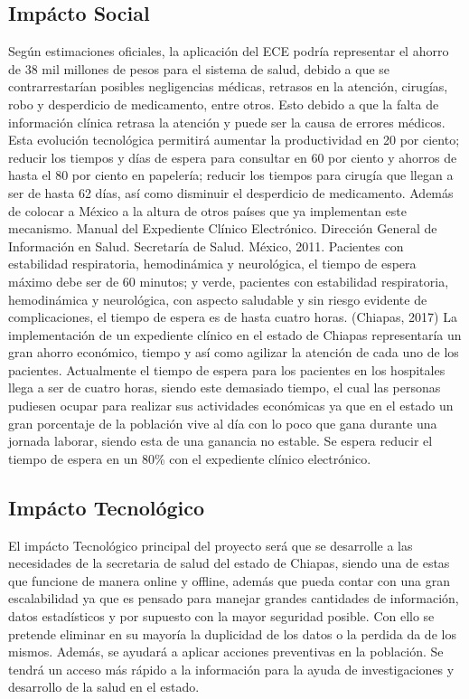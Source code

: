 \subsection{Impácto Social}

Según estimaciones oficiales, la aplicación del ECE podría representar el ahorro de 38 mil millones de pesos para el sistema de salud, debido a que se contrarrestarían posibles negligencias médicas, retrasos en la atención, cirugías, robo y desperdicio de medicamento, entre otros. Esto debido a que la falta de información clínica retrasa la atención y puede ser la causa de errores médicos. Esta evolución tecnológica permitirá aumentar la productividad en 20 por ciento; reducir los tiempos y días de espera para consultar en 60 por ciento y ahorros de hasta el 80 por ciento en papelería; reducir los tiempos para cirugía que llegan a ser de hasta 62 días, así como disminuir el desperdicio de medicamento. Además de colocar a México a la altura de otros países que ya implementan este mecanismo. Manual del Expediente Clínico Electrónico. Dirección General de Información en Salud. Secretaría de Salud. México, 2011.
Pacientes con estabilidad respiratoria, hemodinámica y neurológica, el tiempo de espera máximo debe ser de 60 minutos; y verde, pacientes con estabilidad respiratoria, hemodinámica y neurológica, con aspecto saludable y sin riesgo evidente de complicaciones, el tiempo de espera es de hasta cuatro horas. (Chiapas, 2017)
La implementación de un expediente clínico en el estado de Chiapas representaría un gran ahorro económico, tiempo y así como agilizar la atención de cada uno de los pacientes. Actualmente el tiempo de espera para los pacientes en los hospitales llega a ser de cuatro horas, siendo este demasiado tiempo, el cual las personas pudiesen ocupar para realizar sus actividades económicas ya que en el estado un gran porcentaje de la población vive al día con lo poco que gana durante una jornada laborar, siendo esta de una ganancia no estable. Se espera reducir el tiempo de espera en un 80\% con el expediente clínico electrónico.

\subsection{Impácto Tecnológico}
El impácto Tecnológico principal del proyecto será que se desarrolle a las necesidades de la secretaria de salud del estado de Chiapas, siendo una de estas que funcione de manera online y offline, además que pueda contar con una gran escalabilidad ya que es pensado para manejar grandes cantidades de información, datos estadísticos y por supuesto con la mayor seguridad posible.  Con ello se pretende eliminar en su mayoría la duplicidad de los datos o la perdida da de los mismos. Además, se ayudará a aplicar acciones preventivas en la población. Se tendrá un acceso más rápido a la información para la ayuda de investigaciones y desarrollo de la salud en el estado.

